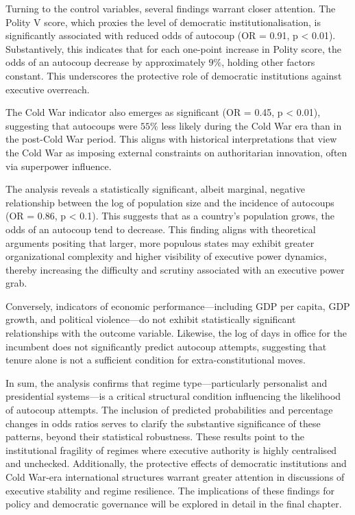 \documentclass[
  12pt,
]{report}
\begin{document}
Turning to the control variables, several findings warrant closer
attention. The Polity V score, which proxies the level of democratic
institutionalisation, is significantly associated with reduced odds of
autocoup (OR = 0.91, p \textless{} 0.01). Substantively, this indicates
that for each one-point increase in Polity score, the odds of an
autocoup decrease by approximately \(9\%\), holding other factors
constant. This underscores the protective role of democratic
institutions against executive overreach.

The Cold War indicator also emerges as significant (OR = 0.45, p
\textless{} 0.01), suggesting that autocoups were \(55\%\) less likely
during the Cold War era than in the post-Cold War period. This aligns
with historical interpretations that view the Cold War as imposing
external constraints on authoritarian innovation, often via superpower
influence.

The analysis reveals a statistically significant, albeit marginal,
negative relationship between the log of population size and the
incidence of autocoups (OR = 0.86, p \textless{} 0.1). This suggests
that as a country's population grows, the odds of an autocoup tend to
decrease. This finding aligns with theoretical arguments positing that
larger, more populous states may exhibit greater organizational
complexity and higher visibility of executive power dynamics, thereby
increasing the difficulty and scrutiny associated with an executive
power grab.

Conversely, indicators of economic performance---including GDP per
capita, GDP growth, and political violence---do not exhibit
statistically significant relationships with the outcome variable.
Likewise, the log of days in office for the incumbent does not
significantly predict autocoup attempts, suggesting that tenure alone is
not a sufficient condition for extra-constitutional moves.

In sum, the analysis confirms that regime type---particularly
personalist and presidential systems---is a critical structural
condition influencing the likelihood of autocoup attempts. The inclusion
of predicted probabilities and percentage changes in odds ratios serves
to clarify the substantive significance of these patterns, beyond their
statistical robustness. These results point to the institutional
fragility of regimes where executive authority is highly centralised and
unchecked. Additionally, the protective effects of democratic
institutions and Cold War-era international structures warrant greater
attention in discussions of executive stability and regime resilience.
The implications of these findings for policy and democratic governance
will be explored in detail in the final chapter.
\end{document}
